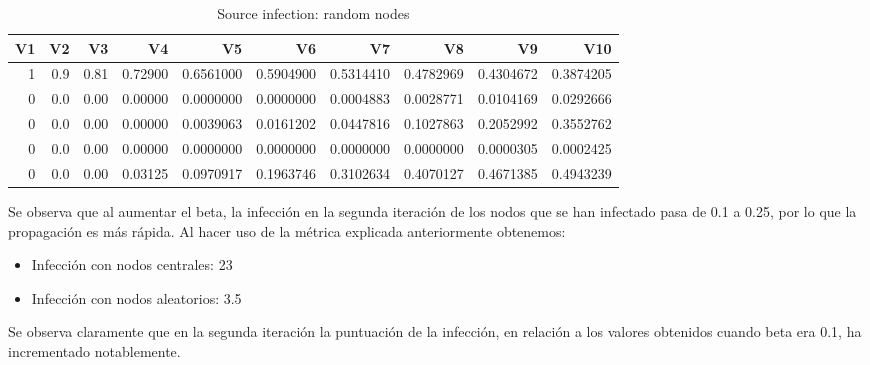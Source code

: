 \documentclass[
]{article}
\begin{document}
\begin{table}[!h]

\caption{\label{tab:unnamed-chunk-8}Source infection: random nodes}
\centering
\fontsize{7}{9}\selectfont
\begin{tabular}[t]{rrrrrrrrrr}
\toprule
V1 & V2 & V3 & V4 & V5 & V6 & V7 & V8 & V9 & V10\\
\midrule
1 & 0.9 & 0.81 & 0.72900 & 0.6561000 & 0.5904900 & 0.5314410 & 0.4782969 & 0.4304672 & 0.3874205\\
0 & 0.0 & 0.00 & 0.00000 & 0.0000000 & 0.0000000 & 0.0004883 & 0.0028771 & 0.0104169 & 0.0292666\\
0 & 0.0 & 0.00 & 0.00000 & 0.0039063 & 0.0161202 & 0.0447816 & 0.1027863 & 0.2052992 & 0.3552762\\
0 & 0.0 & 0.00 & 0.00000 & 0.0000000 & 0.0000000 & 0.0000000 & 0.0000000 & 0.0000305 & 0.0002425\\
0 & 0.0 & 0.00 & 0.03125 & 0.0970917 & 0.1963746 & 0.3102634 & 0.4070127 & 0.4671385 & 0.4943239\\
\bottomrule
\end{tabular}
\end{table}

Se observa que al aumentar el beta, la infección en la segunda iteración
de los nodos que se han infectado pasa de 0.1 a 0.25, por lo que la
propagación es más rápida. Al hacer uso de la métrica explicada
anteriormente obtenemos:

\begin{itemize}
\item
  Infección con nodos centrales: 23
\item
  Infección con nodos aleatorios: 3.5
\end{itemize}

Se observa claramente que en la segunda iteración la puntuación de la
infección, en relación a los valores obtenidos cuando beta era 0.1, ha
incrementado notablemente.
\end{document}
